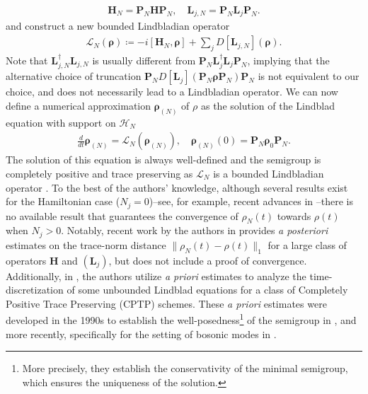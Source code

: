 \documentclass{article}
\newcommand{\xL}{\mathcal{L}}
\newcommand{\xH}{\mathcal{H}}
\newcommand{\rN}{{\boldsymbol{\rho}_{(N)}}}
\let\bf\boldsymbol
\newcommand{\orho}{{\bf \rho}}
\newcommand{\oL}{{\bf L}}
\newcommand{\oH}{{\bf H}}
\newcommand{\oP}{{\bf P}}
\newcommand{\Ndissip}{N_j}
\begin{document}
    \begin{align}
        \oH_N = \oP_N \oH \oP_N, \quad \oL_{j,N} = \oP_N \oL_j \oP_N.
        \label{eq_truncated}
    \end{align}
 and construct a new bounded Lindbladian operator
    \begin{align}
        \mathcal{L}_N(\orho) \coloneqq -i[\oH_N, \orho] + \sum_j D[\oL_{j,N}](\orho).
        \label{eq:Truncated_lindbladian}
    \end{align}
Note that $\oL_{j,N}^\dag \oL_{j,N}$ is usually different from $\oP_N \oL_j^\dag \oL_j \oP_N$, implying that the alternative choice of truncation $\oP_N D[\oL_{j}](\oP_N \orho \oP_N) \oP_N$ is not equivalent to our choice, and does not necessarily lead to a Lindbladian operator.
We can now define a numerical approximation $\rN$ of $\rho$ as the solution of the Lindblad equation with support on $\xH_N$
\begin{align}
    \frac{d}{dt}\rN=\xL_N(\rN),\quad \rN(0)=\oP_N \orho_0 \oP_N.
\end{align}
The solution of this equation is always well-defined and the semigroup is completely positive and trace preserving as $\xL_N$ is a bounded Lindbladian operator \cite{lindbladGeneratorsQuantumDynamical1976}.
To the best of the authors' knowledge, although several results exist for the Hamiltonian case ($\Ndissip=0$)--see, for example, recent advances in \cite{tongProvablyAccurateSimulation2022,fischerQuantumParticleWrong2025,pengQuantumSimulationBosonrelated2025}--there is no available result that guarantees the convergence of $\rho_N(t)$ towards $\rho(t)$ when $\Ndissip > 0$. Notably, recent work by the authors in \cite{etienneyPosterioriErrorEstimates2025} provides \textit{a posteriori} estimates on the trace-norm distance $\|\rho_N(t)-\rho(t)\|_1$ for a large class of operators $\oH$ and $(\oL_j)$, but does not include a proof of convergence. Additionally, in \cite{robinUnconditionallyStableTime2025}, the authors utilize \textit{a priori} estimates to analyze the time-discretization of some unbounded Lindblad equations for a class of Completely Positive Trace Preserving (CPTP) schemes. These \textit{a priori} estimates were developed in the 1990s to establish the well-posedness\footnote{More precisely, they establish the conservativity of the minimal semigroup, which ensures the uniqueness of the solution.} of the semigroup in \cite{chebotarevLindbladEquationUnbounded1997,chebotarevPrioriEstimatesQuantum2003,chebotarevSufficientConditionsConservativity1998}, and more recently, specifically for the setting of bosonic modes in \cite{gondolfEnergyPreservingEvolutions2024}.
\end{document}
